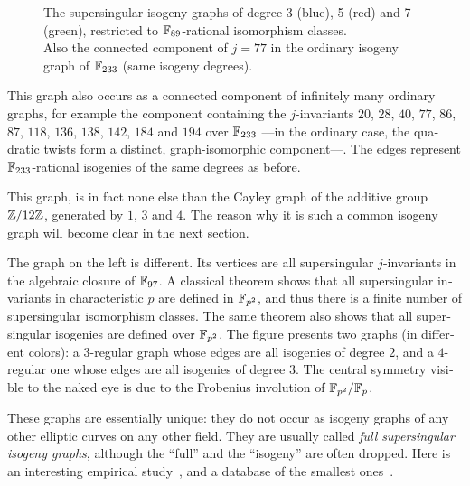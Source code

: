 \begin{otherlanguage}{english}
\begin{figure}
\begin{minipage}{0.47\textwidth}
      \caption{The supersingular isogeny graphs of degree 3 (blue), 5
        (red) and 7 (green), restricted to $\mathbb{F}_{89}$-rational
        isomorphism classes.\\
        Also the connected component of $j=77$ in the ordinary isogeny
        graph of $\mathbb{F}_{233}$ (same isogeny degrees).}
      \label{fig:csidh}
    \end{minipage}
  \end{figure}

  This graph also occurs as a connected component of infinitely many
  ordinary graphs, for example the component containing the
  $j$-invariants $20$, $28$, $40$, $77$, $86$, $87$, $118$, $136$,
  $138$, $142$, $184$ and $194$ over $\mathbb{F}_{233}$ ---in the ordinary
  case, the quadratic twists form a distinct, graph-isomorphic
  component---. The edges represent $\mathbb{F}_{233}$-rational isogenies of
  the same degrees as before.

  This graph, is in fact none else than the Cayley graph of the
  additive group $\mathbb{Z}/12\mathbb{Z}$, generated by $1$, $3$ and $4$. The reason
  why it is such a common isogeny graph will become clear in the next
  section.

  The graph on the left is different. Its vertices are all
  supersingular $j$-invariants in the algebraic closure of
  $\mathbb{F}_{97}$. A classical theorem shows that all supersingular
  invariants in characteristic $p$ are defined in $\mathbb{F}_{p^2}$, and thus
  there is a finite number of supersingular isomorphism classes. The
  same theorem also shows that all supersingular isogenies are defined
  over $\mathbb{F}_{p^2}$. The figure presents two graphs (in different
  colors): a $3$-regular graph whose edges are all isogenies of degree
  $2$, and a $4$-regular one whose edges are all isogenies of degree
  $3$. The central symmetry visible to the naked eye is due to the
  Frobenius involution of $\mathbb{F}_{p^2}/\mathbb{F}_p$.

  These graphs are essentially unique: they do not occur as isogeny
  graphs of any other elliptic curves on any other field. They are
  usually called \emph{full supersingular isogeny graphs}, although
  the ``full'' and the ``isogeny'' are often dropped. Here is an
  interesting empirical study~\cite{cryptoeprint:2019:1056}, and a
  database of the smallest ones~\cite{ssingular-db}.


\end{otherlanguage}
